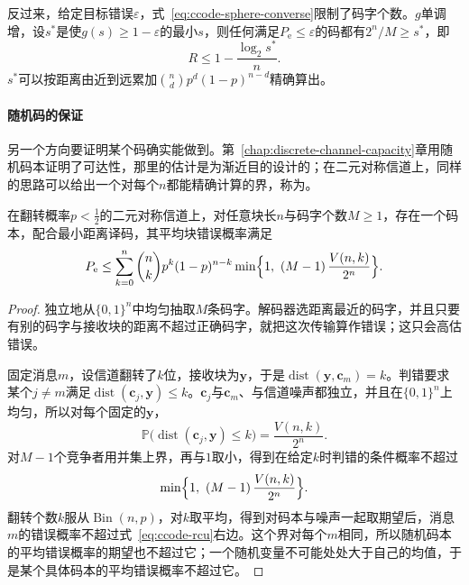 反过来，给定目标错误$\varepsilon$，式~\eqref{eq:ccode-sphere-converse}限制了码字个数。$g$单调增，设$s^{*}$是使$g(s)\geq1-\varepsilon$的最小$s$，则任何满足$P_{\mathrm{e}}\leq\varepsilon$的码都有$2^{n}/M\geq s^{*}$，即
\begin{equation}
 R\leq1-\frac{\log_2s^{*}}{n} .
 \label{eq:ccode-converse-rate}
\end{equation}
$s^{*}$可以按距离由近到远累加$\binom nd p^{d}(1-p)^{n-d}$精确算出。

\paragraph{随机码的保证}
另一个方向要证明某个码确实能做到。第~\ref{chap:discrete-channel-capacity}章用随机码本证明了可达性，那里的估计是为渐近目的设计的；在二元对称信道上，同样的思路可以给出一个对每个$n$都能精确计算的界，称为。

\begin{theorem}[随机编码并集界]
\label{thm:ccode-rcu}
在翻转概率$p<\tfrac12$的二元对称信道上，对任意块长$n$与码字个数$M\geq1$，存在一个码本，配合最小距离译码，其平均块错误概率满足
\begin{equation}
 P_{\mathrm{e}}\leq\sum_{k=0}^{n}\binom nk p^{k}(1-p)^{n-k}\min\Bigl\{1,\ (M-1)\,\frac{V(n,k)}{2^{n}}\Bigr\} .
 \label{eq:ccode-rcu}
\end{equation}
\end{theorem}

\begin{proof}
独立地从$\{0,1\}^{n}$中均匀抽取$M$条码字。解码器选距离最近的码字，并且只要有别的码字与接收块的距离不超过正确码字，就把这次传输算作错误；这只会高估错误。

固定消息$m$，设信道翻转了$k$位，接收块为$\bm{y}$，于是$\operatorname{dist}(\bm{y},\bm{c}_m)=k$。判错要求某个$j\neq m$满足$\operatorname{dist}(\bm{c}_j,\bm{y})\leq k$。$\bm{c}_j$与$\bm{c}_m$、与信道噪声都独立，并且在$\{0,1\}^{n}$上均匀，所以对每个固定的$\bm{y}$，
\[
 \mathbb{P}\bigl(\operatorname{dist}(\bm{c}_j,\bm{y})\leq k\bigr)=\frac{V(n,k)}{2^{n}} .
\]
对$M-1$个竞争者用并集上界，再与$1$取小，得到在给定$k$时判错的条件概率不超过
\[
 \min\Bigl\{1,\ (M-1)\,\frac{V(n,k)}{2^{n}}\Bigr\} .
\]
翻转个数$k$服从$\operatorname{Bin}(n,p)$，对$k$取平均，得到对码本与噪声一起取期望后，消息$m$的错误概率不超过式~\eqref{eq:ccode-rcu}右边。这个界对每个$m$相同，所以随机码本的平均错误概率的期望也不超过它；一个随机变量不可能处处大于自己的均值，于是某个具体码本的平均错误概率不超过它。
\end{proof}

